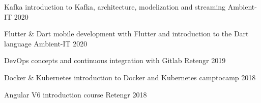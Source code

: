 


\begin{cvhonors}


\cvhonor
{Kafka} %
{introduction to Kafka, architecture, modelization and streaming} %
{Ambient-IT} %
{2020} %


\cvhonor
{Flutter \& Dart} %
{mobile development with Flutter and introduction to the Dart language} %
{Ambient-IT} %
{2020} %


\cvhonor
{DevOps} %
{concepts and continuous integration with Gitlab} %
{Retengr} %
{2019} %


\cvhonor
{Docker \& Kubernetes} %
{introduction to Docker and Kubernetes} %
{camptocamp} %
{2018} %


\cvhonor
{Angular V6} %
{introduction course} %
{Retengr} %
{2018} %


\end{cvhonors}
